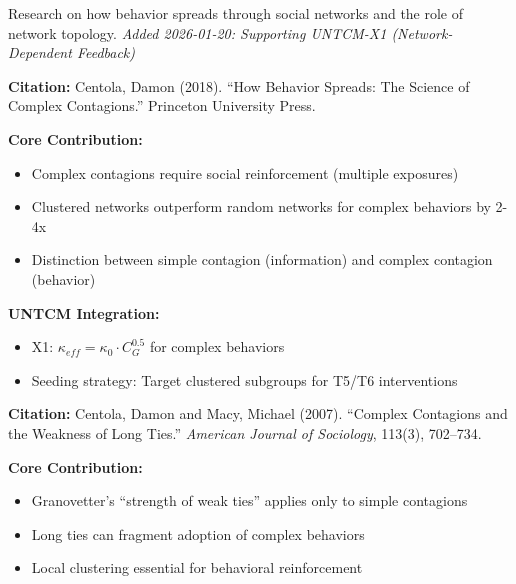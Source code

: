 Research on how behavior spreads through social networks and the role of network topology.
\textit{Added 2026-01-20: Supporting UNTCM-X1 (Network-Dependent Feedback)}

\begin{tcolorbox}[colback=yellow!5!white,colframe=yellow!75!black,title=Key Paper: Centola (2018)]
\textbf{Citation:} Centola, Damon (2018). ``How Behavior Spreads: The Science of Complex Contagions.'' Princeton University Press.

\textbf{Core Contribution:}
\begin{itemize}[nosep]
    \item Complex contagions require social reinforcement (multiple exposures)
    \item Clustered networks outperform random networks for complex behaviors by 2-4x
    \item Distinction between simple contagion (information) and complex contagion (behavior)
\end{itemize}

\textbf{UNTCM Integration:}
\begin{itemize}[nosep]
    \item X1: $\kappa_{eff} = \kappa_0 \cdot C_G^{0.5}$ for complex behaviors
    \item Seeding strategy: Target clustered subgroups for T5/T6 interventions
\end{itemize}
\end{tcolorbox}

\begin{tcolorbox}[colback=yellow!5!white,colframe=yellow!75!black,title=Key Paper: Centola \& Macy (2007)]
\textbf{Citation:} Centola, Damon and Macy, Michael (2007). ``Complex Contagions and the Weakness of Long Ties.'' \textit{American Journal of Sociology}, 113(3), 702--734.

\textbf{Core Contribution:}
\begin{itemize}[nosep]
    \item Granovetter's ``strength of weak ties'' applies only to simple contagions
    \item Long ties can fragment adoption of complex behaviors
    \item Local clustering essential for behavioral reinforcement
\end{itemize}
\end{tcolorbox}

